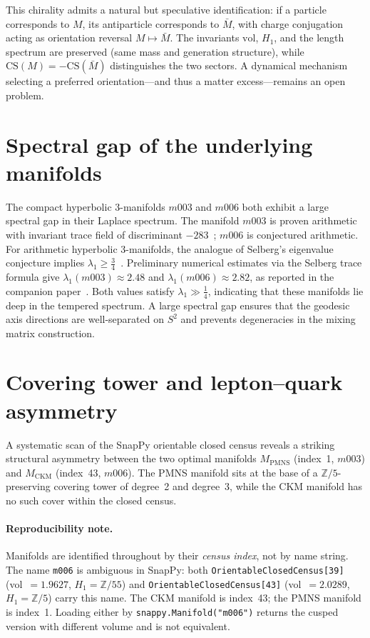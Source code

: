 \documentclass[12pt]{article}
\theoremstyle{definition}
\begin{document}
This chirality admits a natural but speculative identification: if a
particle corresponds to $M$, its antiparticle corresponds to $\bar{M}$,
with charge conjugation acting as orientation reversal
$M\mapsto\bar{M}$. The invariants $\mathrm{vol}$, $H_1$, and the
length spectrum are preserved (same mass and generation structure),
while $\mathrm{CS}(M) = -\mathrm{CS}(\bar{M})$ distinguishes the two
sectors. A dynamical mechanism selecting a preferred orientation---and
thus a matter excess---remains an open problem.

\section{Spectral gap of the underlying manifolds}
\label{sec:spectral}

The compact hyperbolic 3-manifolds $m003$ and $m006$ both exhibit a
large spectral gap in their Laplace spectrum.
The manifold $m003$ is proven arithmetic with invariant trace field
of discriminant $-283$~\cite{Chinburg98}; $m006$ is conjectured arithmetic.
For arithmetic hyperbolic 3-manifolds, the analogue of Selberg's
eigenvalue conjecture implies $\lambda_1 \geq \tfrac{3}{4}$~\cite{Sarnak}.
Preliminary numerical estimates via the Selberg trace formula give
$\lambda_1(m003) \approx 2.48$ and $\lambda_1(m006) \approx 2.82$,
as reported in the companion paper~\cite{Gentry:Twist}.
Both values satisfy $\lambda_1 \gg \tfrac{1}{4}$, indicating that
these manifolds lie deep in the tempered spectrum.
A large spectral gap ensures that the geodesic axis directions are
well-separated on $S^2$ and prevents degeneracies in the mixing
matrix construction.


\section{Covering tower and lepton--quark asymmetry}
\label{sec:covering_tower}

A systematic scan of the SnapPy orientable closed census reveals
a striking structural asymmetry between the two optimal manifolds
$M_\text{PMNS}$ (index~1, $m003$) and $M_\text{CKM}$ (index~43, $m006$).
The PMNS manifold sits at the base of a $\mathbb{Z}/5$-preserving
covering tower of degree~2 and degree~3, while the CKM manifold
has no such cover within the closed census.

\paragraph{Reproducibility note.}
Manifolds are identified throughout by their \emph{census index}, not
by name string. The name \texttt{m006} is ambiguous in SnapPy: both
\texttt{OrientableClosedCensus[39]} (vol~$=1.9627$, $H_1=\mathbb{Z}/55$)
and \texttt{OrientableClosedCensus[43]} (vol~$=2.0289$, $H_1=\mathbb{Z}/5$)
carry this name. The CKM manifold is index~43; the PMNS manifold is index~1.
Loading either by \texttt{snappy.Manifold("m006")} returns the cusped version
with different volume and is not equivalent.
\end{document}
